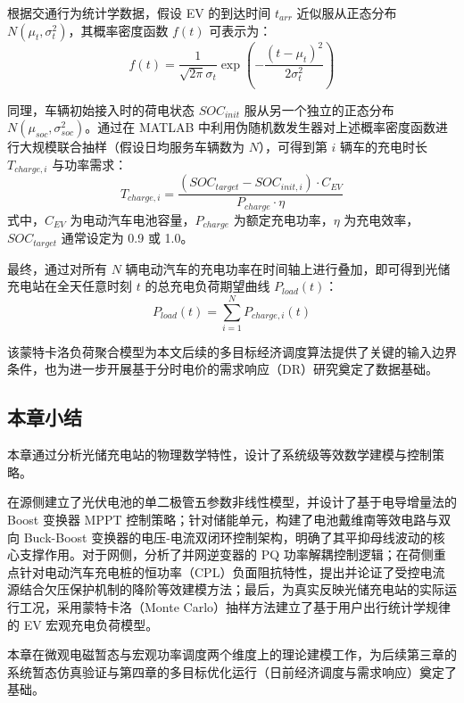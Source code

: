 根据交通行为统计学数据，假设 EV 的到达时间 $t_{arr}$ 近似服从正态分布 $N(\mu_t, \sigma_t^2)$，其概率密度函数 $f(t)$ 可表示为：
\begin{equation}
    f(t) = \frac{1}{\sqrt{2\pi}\sigma_t} \exp\left( -\frac{(t - \mu_t)^2}{2\sigma_t^2} \right)
\end{equation}

同理，车辆初始接入时的荷电状态 $SOC_{init}$ 服从另一个独立的正态分布 $N(\mu_{soc}, \sigma_{soc}^2)$。通过在 MATLAB 中利用伪随机数发生器对上述概率密度函数进行大规模联合抽样（假设日均服务车辆数为 $N$），可得到第 $i$ 辆车的充电时长 $T_{charge,i}$ 与功率需求：
\begin{equation}
    T_{charge,i} = \frac{(SOC_{target} - SOC_{init,i}) \cdot C_{EV}}{P_{charge} \cdot \eta}
\end{equation}
式中，$C_{EV}$ 为电动汽车电池容量，$P_{charge}$ 为额定充电功率，$\eta$ 为充电效率，$SOC_{target}$ 通常设定为 0.9 或 1.0。

最终，通过对所有 $N$ 辆电动汽车的充电功率在时间轴上进行叠加，即可得到光储充电站在全天任意时刻 $t$ 的总充电负荷期望曲线 $P_{load}(t)$：
\begin{equation}
    P_{load}(t) = \sum_{i=1}^{N} P_{charge,i}(t)
\end{equation}

该蒙特卡洛负荷聚合模型为本文后续的多目标经济调度算法提供了关键的输入边界条件，也为进一步开展基于分时电价的需求响应（DR）研究奠定了数据基础。

\subsection{本章小结}

本章通过分析光储充电站的物理数学特性，设计了系统级等效数学建模与控制策略。

在源侧建立了光伏电池的单二极管五参数非线性模型，并设计了基于电导增量法的 Boost 变换器 MPPT 控制策略；针对储能单元，构建了电池戴维南等效电路与双向 Buck-Boost 变换器的电压-电流双闭环控制架构，明确了其平抑母线波动的核心支撑作用。对于网侧，分析了并网逆变器的 PQ 功率解耦控制逻辑；在荷侧重点针对电动汽车充电桩的恒功率（CPL）负面阻抗特性，提出并论证了受控电流源结合欠压保护机制的降阶等效建模方法；最后，为真实反映光储充电站的实际运行工况，采用蒙特卡洛（Monte Carlo）抽样方法建立了基于用户出行统计学规律的 EV 宏观充电负荷模型。

本章在微观电磁暂态与宏观功率调度两个维度上的理论建模工作，为后续第三章的系统暂态仿真验证与第四章的多目标优化运行（日前经济调度与需求响应）奠定了基础。